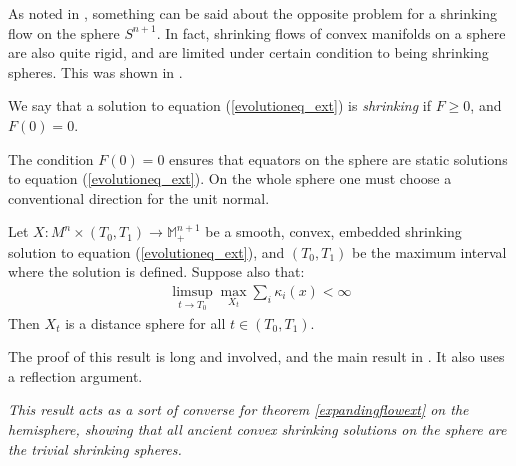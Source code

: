As noted in \cite{summary}, something can be said about the opposite problem for a shrinking flow on the sphere $S^{n+1}$. In fact, shrinking flows of convex manifolds on a sphere are also quite rigid, and are limited under certain condition to being shrinking spheres. This was shown in \cite{BryanIvakiScheuer}. 

\begin{defin}
	We say that a solution to equation (\ref{evolutioneq_ext}) is {\em shrinking} if $F\geq 0$, and $F(0)=0$. 
\end{defin}
The condition $F(0)=0$ ensures that equators on the sphere are static solutions to equation (\ref{evolutioneq_ext}). On the whole sphere one must choose a conventional direction for the unit normal. 


\begin{theorem}
	Let $ X : M^n \times (T_0, T_1) \to \mathbb{M}^{n+1}_+ $ be a smooth, convex, embedded shrinking solution to equation (\ref{evolutioneq_ext}), and $ (T_0, T_1)$ be the maximum interval where the solution is defined. Suppose also that:
	\begin{align*}
		\limsup_{t\rightarrow T_0} \max_{X_t} \sum_i \kappa_i(x)<\infty
	\end{align*}
	Then $X_t$ is a distance sphere for all $t\in  (T_0, T_1)$.
\end{theorem}

The proof of this result is long and involved, and the main result in \cite{BryanIvakiScheuer}. It also uses a reflection argument. 
\begin{oss}
	\em
	This result acts as a sort of converse for theorem \ref{expandingflowext} on the hemisphere, showing that all ancient convex shrinking solutions on the sphere are the trivial shrinking spheres. 
\end{oss}